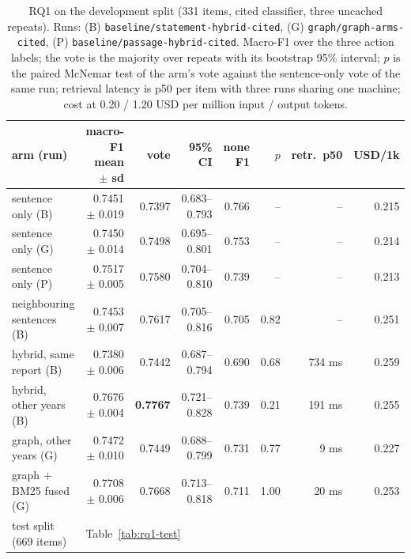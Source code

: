 \documentclass[11pt]{article}
\newcommand{\run}[1]{\nolinkurl{#1}}
\begin{document}
\begin{table}[!htbp]
\centering\footnotesize
\setlength{\tabcolsep}{4pt}
\begin{tabular*}{\linewidth}{@{}@{\extracolsep{\fill}}lrrrrrrr@{}}
\toprule
arm (run) & macro-F1 mean $\pm$ sd & vote & 95\% CI & none F1 & $p$ & retr.\ p50 & USD/1k \\
\midrule
sentence only (B) & 0.7451 $\pm$ 0.019 & 0.7397 & 0.683--0.793 & 0.766 & -- & -- & 0.215 \\
sentence only (G) & 0.7450 $\pm$ 0.014 & 0.7498 & 0.695--0.801 & 0.753 & -- & -- & 0.214 \\
sentence only (P) & 0.7517 $\pm$ 0.005 & 0.7580 & 0.704--0.810 & 0.739 & -- & -- & 0.213 \\
neighbouring sentences (B) & 0.7453 $\pm$ 0.007 & 0.7617 & 0.705--0.816 & 0.705 & 0.82 & -- & 0.251 \\
hybrid, same report (B) & 0.7380 $\pm$ 0.006 & 0.7442 & 0.687--0.794 & 0.690 & 0.68 & 734 ms & 0.259 \\
hybrid, other years (B) & 0.7676 $\pm$ 0.004 & \textbf{0.7767} & 0.721--0.828 & 0.739 & 0.21 & 191 ms & 0.255 \\
graph, other years (G) & 0.7472 $\pm$ 0.010 & 0.7449 & 0.688--0.799 & 0.731 & 0.77 & 9 ms & 0.227 \\
graph + BM25 fused (G) & 0.7708 $\pm$ 0.006 & 0.7668 & 0.713--0.818 & 0.711 & 1.00 & 20 ms & 0.253 \\
\midrule
test split (669 items) & \multicolumn{7}{l}{Table~\ref{tab:rq1-test}} \\
\bottomrule
\end{tabular*}
\caption{RQ1 on the development split (331 items, cited classifier, three uncached repeats). Runs: (B) \run{baseline/statement-hybrid-cited}, (G) \run{graph/graph-arms-cited}, (P) \run{baseline/passage-hybrid-cited}. Macro-F1 over the three action labels; the vote is the majority over repeats with its bootstrap 95\% interval; $p$ is the paired McNemar test of the arm's vote against the sentence-only vote of the same run; retrieval latency is p50 per item with three runs sharing one machine; cost at 0.20 / 1.20 USD per million input / output tokens.}
\label{tab:rq1-main}
\end{table}
\end{document}
